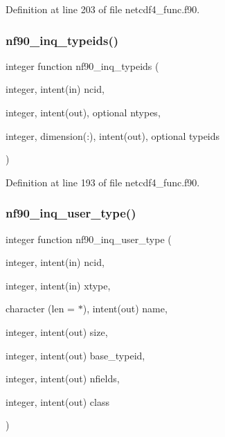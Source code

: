 Definition at line 203 of file netcdf4\+\_\+func.\+f90.

\mbox{\label{netcdf4__func_8f90_a2bdbb694c367a100f148c2fe7123703b}} 
\subsubsection{\texorpdfstring{nf90\+\_\+inq\+\_\+typeids()}{nf90\_inq\_typeids()}}
{\footnotesize\ttfamily integer function nf90\+\_\+inq\+\_\+typeids (\begin{DoxyParamCaption}\item[{integer, intent(in)}]{ncid,  }\item[{integer, intent(out), optional}]{ntypes,  }\item[{integer, dimension(\+:), intent(out), optional}]{typeids }\end{DoxyParamCaption})}



Definition at line 193 of file netcdf4\+\_\+func.\+f90.

\mbox{\label{netcdf4__func_8f90_a9554f06f96c5793f6c00f16b61ed656a}} 
\subsubsection{\texorpdfstring{nf90\+\_\+inq\+\_\+user\+\_\+type()}{nf90\_inq\_user\_type()}}
{\footnotesize\ttfamily integer function nf90\+\_\+inq\+\_\+user\+\_\+type (\begin{DoxyParamCaption}\item[{integer, intent(in)}]{ncid,  }\item[{integer, intent(in)}]{xtype,  }\item[{character (len = $\ast$), intent(out)}]{name,  }\item[{integer, intent(out)}]{size,  }\item[{integer, intent(out)}]{base\+\_\+typeid,  }\item[{integer, intent(out)}]{nfields,  }\item[{integer, intent(out)}]{class }\end{DoxyParamCaption})}



